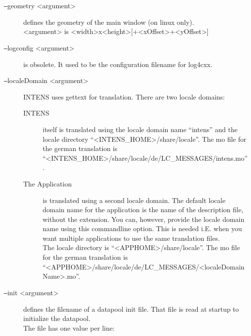 \begin{description}
\item[\texttt{--}geometry <argument>] defines the geometry of the main window (on linux only). \\
  <argument> is <width>x<height>[+<xOffset>+<yOffset>]
%
%
%
%
%
%
%
%
%
\item[\texttt{--}logconfig <argument>] is obsolete.
  It used to be the configuration filename for log4cxx.
%
\item[\texttt{--}localeDomain <argument>]
  INTENS uses gettext for translation. There are two locale domains:
  \begin{description}
  \item[INTENS] itself is translated using the locale domain name ``intens''
  and the locale directory ``<INTENS\_HOME>/share/locale''.
  The mo file for the german translation is
  ``<INTENS\_HOME>/share/locale/de/LC\_MESSAGES/intens.mo''.
  \item[The Application] is translated using a second locale domain.
  The default locale domain name for the application is the name
  of the description file, without the extension. You can, however,
  provide the locale domain name using this commandline option.
  This is needed i.E. when you want multiple applications to use the
  same translation files. \\
  The locale directory is ``<APPHOME>/share/locale''.
  The mo file for the german translation is
  ``<APPHOME>/share/locale/de/LC\_MESSAGES/<localeDomainName>.mo''.
  \end{description}
%
\item[\texttt{--}init <argument>] defines the filename of a datapool init file.
  That file is read at startup to initialize the datapool. \\
  The file has one value per line:
  \begin{description}

\end{description}
\end{description}
